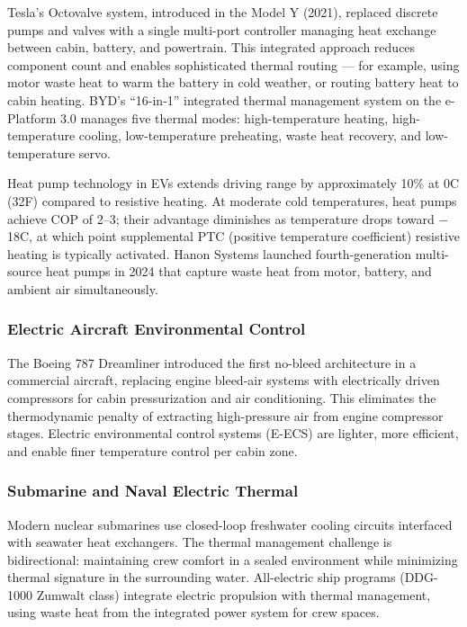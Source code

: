\documentclass[11pt,letterpaper]{article}
\begin{document}
Tesla's Octovalve system, introduced in the Model Y (2021), replaced discrete pumps and valves with a single multi-port controller managing heat exchange between cabin, battery, and powertrain. This integrated approach reduces component count and enables sophisticated thermal routing --- for example, using motor waste heat to warm the battery in cold weather, or routing battery heat to cabin heating. BYD's ``16-in-1'' integrated thermal management system on the e-Platform 3.0 manages five thermal modes: high-temperature heating, high-temperature cooling, low-temperature preheating, waste heat recovery, and low-temperature servo.

Heat pump technology in EVs extends driving range by approximately 10\% at 0\textdegree C (32\textdegree F) compared to resistive heating. At moderate cold temperatures, heat pumps achieve COP of 2--3; their advantage diminishes as temperature drops toward $-$18\textdegree C, at which point supplemental PTC (positive temperature coefficient) resistive heating is typically activated. Hanon Systems launched fourth-generation multi-source heat pumps in 2024 that capture waste heat from motor, battery, and ambient air simultaneously.

\subsubsection{Electric Aircraft Environmental Control}
The Boeing 787 Dreamliner introduced the first no-bleed architecture in a commercial aircraft, replacing engine bleed-air systems with electrically driven compressors for cabin pressurization and air conditioning. This eliminates the thermodynamic penalty of extracting high-pressure air from engine compressor stages. Electric environmental control systems (E-ECS) are lighter, more efficient, and enable finer temperature control per cabin zone.

\subsubsection{Submarine and Naval Electric Thermal}
Modern nuclear submarines use closed-loop freshwater cooling circuits interfaced with seawater heat exchangers. The thermal management challenge is bidirectional: maintaining crew comfort in a sealed environment while minimizing thermal signature in the surrounding water. All-electric ship programs (DDG-1000 Zumwalt class) integrate electric propulsion with thermal management, using waste heat from the integrated power system for crew spaces.
\end{document}
